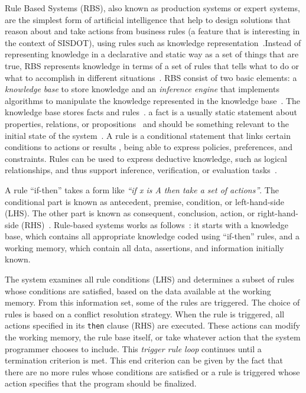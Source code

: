 \documentclass{bmcart}
\begin{document}
Rule Based Systems (RBS), also known as production systems or expert systems, are the simplest form of artificial intelligence that help to design solutions that reason about and take actions from business rules (a feature that is interesting in the context of SISDOT), using rules such as knowledge representation~\cite{grosan2011}.Instead of representing knowledge in a declarative and static way as a set of things that are true, RBS represents knowledge in terms of a set of rules that tells what to do or what to accomplish in different situations~\cite{grosan2011}. RBS consist of two basic elements: a \emph{knowledge base} to store knowledge and an \emph{inference engine} that implements  algorithms to manipulate the knowledge represented in the knowledge base~\cite{grosan2011,DBLP:books/daglib/0070547,gallacher1989}. The knowledge base stores facts and rules~\cite{DBLP:journals/cacm/Hayes-Roth85}. a fact is a usually static statement about properties, relations, or propositions~\cite{DBLP:journals/cacm/Hayes-Roth85} and should be something relevant to the initial state of the system~\cite{grosan2011}. A rule is a conditional statement that links certain conditions to actions or results \cite{abraham2005}, being able to express policies, preferences, and constraints. Rules can be used to express deductive knowledge, such as logical relationships, and thus support inference, verification, or evaluation tasks~\cite{DBLP:journals/cacm/Hayes-Roth85}.

A rule ``if-then'' takes a form like \emph{``if x is A then take a set of actions''}. The conditional part is known as antecedent, premise, condition, or left-hand-side (LHS). The other part is known as consequent, conclusion, action, or right-hand-side (RHS)~\cite{grosan2011,abraham2005}. Rule-based systems works as follows~\cite{grosan2011}: it starts with a knowledge base, which contains all appropriate knowledge coded using ``if-then'' rules, and a working memory, which contain all data, assertions, and information initially known. 

The system examines all rule conditions (LHS) and determines a subset of rules whose conditions are satisfied, based on the data available at the working memory. From this information set, some of the rules are triggered. The choice of rules is based on a conflict resolution strategy. When the rule is triggered, all actions specified in its \texttt{then} clause (RHS) are executed. These actions can modify the working memory, the rule base itself, or take whatever action that the system programmer chooses to include. This \emph{trigger rule loop} continues until a termination criterion is met. This end criterion can be given by the fact that there are no more rules whose conditions are satisfied or a rule is triggered whose action specifies that the program should be finalized.
\end{document}
